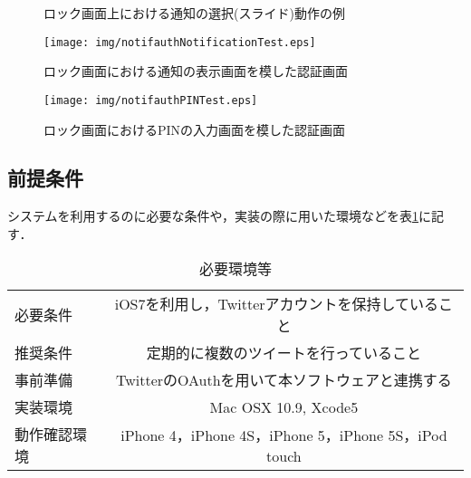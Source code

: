 \begin{figure}[ht]
  \begin{center}
  \end{center}
  \caption{ロック画面上における通知の選択(スライド)動作の例}
  \label{fig:notificationSliding}
\end{figure}

\begin{figure}[ht]
  \begin{minipage}{0.5\hsize}
    \begin{center}
      \texttt{[image: img/notifauthNotificationTest.eps]}
    \end{center}
    \caption{ロック画面における通知の表示画面を模した認証画面}
    \label{fig:notifauthNotificationTest}
  \end{minipage}
  \begin{minipage}{0.5\hsize}
    \begin{center}
      \texttt{[image: img/notifauthPINTest.eps]}
    \end{center}
    \caption{ロック画面におけるPINの入力画面を模した認証画面}
    \label{fig:notifauthPINTest}
  \end{minipage}
\end{figure}

\subsection{前提条件}
システムを利用するのに必要な条件や，実装の際に用いた環境などを表\ref{tbl:requirements}に記す．

\begin{table}[htpb]
  \begin{center}
    \caption{必要環境等}
    \label{tbl:requirements}
    \vspace{4mm}
    \begin{tabular}{l||c}
    必要条件 & iOS7を利用し，Twitterアカウントを保持していること \\
    推奨条件 & 定期的に複数のツイートを行っていること \\
    事前準備 & TwitterのOAuthを用いて本ソフトウェアと連携する \\
    実装環境 & Mac OSX 10.9, Xcode5 \\
    動作確認環境 & iPhone 4，iPhone 4S，iPhone 5，iPhone 5S，iPod touch \\
    \end{tabular}
  \end{center}
\end{table}

